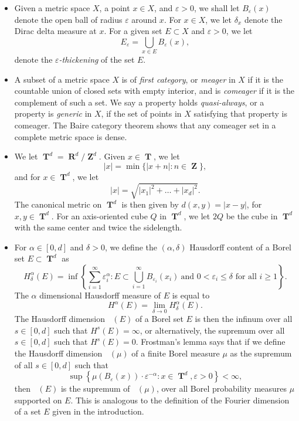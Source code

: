 \documentclass[12pt,reqno]{article}
\numberwithin{equation}{section}
\DeclareMathOperator{\hausdim}{\dim_{\mathbf{H}}}
\DeclareMathOperator{\RR}{\mathbf{R}}
\DeclareMathOperator{\ZZ}{\mathbf{Z}}
\DeclareMathOperator{\TT}{\mathbf{T}}
\numberwithin{theorem}{section}
\begin{document}
\begin{itemize}

    \item Given a metric space $X$, a point $x \in X$, and $\varepsilon > 0$, we shall let $B_\varepsilon(x)$ denote the open ball of radius $\varepsilon$ around $x$. For $x \in X$, we let $\delta_x$ denote the Dirac delta measure at $x$. For a given set $E \subset X$ and $\varepsilon > 0$, we let
    \[ E_\varepsilon = \bigcup_{x \in E} B_\varepsilon(x), \]
    denote the \emph{$\varepsilon$-thickening} of the set $E$.

    \item A subset of a metric space $X$ is of \emph{first category}, or \emph{meager} in $X$ if it is the countable union of closed sets with empty interior, and is \emph{comeager} if it is the complement of such a set. We say a property holds \emph{quasi-always}, or a property is \emph{generic} in $X$, if the set of points in $X$ satisfying that property is comeager. The Baire category theorem shows that any comeager set in a complete metric space is dense.

    \item We let $\TT^d = \RR^d/\ZZ^d$. Given $x \in \TT$, we let
    \[ |x| = \min \{ |x + n| : n \in \ZZ \}, \]
    and for $x \in \TT^d$, we let
    \[ |x| = \sqrt{|x_1|^2 + \dots + |x_d|^2}. \]
    The canonical metric on $\TT^d$ is then given by $d(x,y) = |x - y|$, for $x,y \in \TT^d$. For an axis-oriented cube $Q$ in $\TT^d$, we let $2Q$ be the cube in $\TT^d$ with the same center and twice the sidelength.

    \item For $\alpha \in [0,d]$ and $\delta > 0$, we define the $(\alpha,\delta)$ Hausdorff content of a Borel set $E \subset \TT^d$ as
    \[ H^\alpha_\delta(E) = \inf \left\{ \sum_{i = 1}^\infty \varepsilon_i^\alpha : E \subset \bigcup_{i = 1}^\infty B_{\varepsilon_i}(x_i)\ \text{and $0 < \varepsilon_i \leq \delta$ for all $i \geq 1$} \right\}. \]
    The $\alpha$ dimensional Hausdorff measure of $E$ is equal to
    \[ H^\alpha(E) = \lim_{\delta \to 0} H^\alpha_\delta(E). \]
    The Hausdorff dimension $\hausdim(E)$ of a Borel set $E$ is then the infinum over all $s \in [0,d]$ such that $H^s(E) = \infty$, or alternatively, the supremum over all $s \in [0,d]$ such that $H^s(E) = 0$. Frostman's lemma says that if we define the Hausdorff dimension $\hausdim(\mu)$ of a finite Borel measure $\mu$ as the supremum of all $s \in [0,d]$ such that
    \[ \sup \left\{ \mu(B_\varepsilon(x)) \cdot \varepsilon^{-\alpha} : x \in \TT^d, \varepsilon > 0 \right\} < \infty, \]
    then $\hausdim(E)$ is the supremum of $\hausdim(\mu)$, over all Borel probability measures $\mu$ supported on $E$. This is analogous to the definition of the Fourier dimension of a set $E$ given in the introduction.


\end{itemize}
\end{document}
